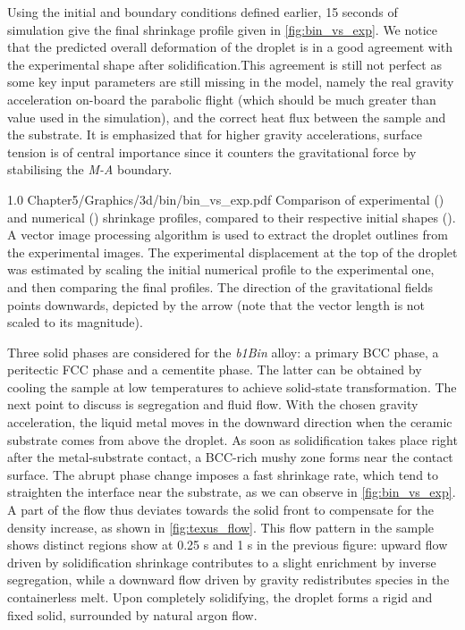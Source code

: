 Using the initial and boundary conditions defined earlier, 15 seconds of simulation give the final shrinkage profile given in \cref{fig:bin_vs_exp}.
We notice that the predicted overall deformation of the droplet is in a good agreement with the experimental shape after solidification.This agreement is
still not perfect as some key input parameters are still missing in the model, namely the real gravity acceleration on-board the parabolic flight (which should
be much greater than value used in the simulation), and the correct heat flux between the sample and the substrate. It is emphasized that for higher gravity
accelerations, surface tension is of central importance since it counters the gravitational force by stabilising the \emph{M-A} boundary.

\begin{figureth}
{1.0}
{Chapter5/Graphics/3d/bin/bin_vs_exp.pdf}
{Comparison of experimental () and numerical () shrinkage profiles, compared to their respective initial shapes (). 
A vector image processing algorithm is used to extract the droplet outlines from the experimental images. 
The experimental displacement at the top of the droplet was estimated by scaling 
the initial numerical profile to the experimental one, and then comparing the final profiles.
The direction of the gravitational fields points downwards, depicted
  by the arrow (note that the vector length is not scaled to its magnitude).}
\label{fig:bin_vs_exp}
\end{figureth}

Three solid phases are considered for the \emph{b1Bin} alloy: a primary BCC phase, a peritectic FCC phase and a cementite phase. 
The latter can be obtained by cooling the sample at low temperatures to achieve solid-state transformation.
The next point to discuss is segregation and fluid flow. With the chosen gravity acceleration, the liquid metal moves in the downward direction when the
ceramic substrate comes from above the droplet. As soon as solidification takes place right after the metal-substrate contact, a BCC-rich mushy zone 
forms near the contact surface. The abrupt phase change imposes a fast shrinkage rate, which tend to straighten the interface near the substrate, as we can observe in \cref{fig:bin_vs_exp}. 
A part of the flow thus deviates towards the solid front 
to compensate for the density increase, as shown in \cref{fig:texus_flow}. 
This flow pattern in the sample shows distinct regions show at 0.25 s and 1 s in the previous figure: 
upward flow driven by solidification shrinkage contributes to a slight enrichment by inverse segregation,
while a downward flow driven by gravity redistributes species in the containerless melt. Upon completely 
solidifying, the droplet forms a rigid and fixed solid, surrounded by natural argon flow. 

